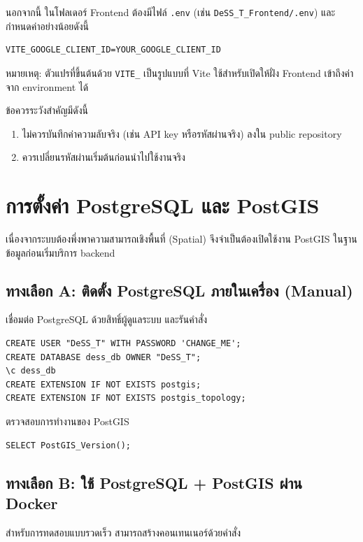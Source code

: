 นอกจากนี้ ในโฟลเดอร์ Frontend ต้องมีไฟล์ \texttt{.env} (เช่น \texttt{DeSS\_T\_Frontend/.env}) และกำหนดค่าอย่างน้อยดังนี้
\begin{verbatim}
VITE_GOOGLE_CLIENT_ID=YOUR_GOOGLE_CLIENT_ID
\end{verbatim}

หมายเหตุ: ตัวแปรที่ขึ้นต้นด้วย \texttt{VITE\_} เป็นรูปแบบที่ Vite ใช้สำหรับเปิดให้ฝั่ง Frontend เข้าถึงค่าจาก environment ได้

ข้อควรระวังสำคัญมีดังนี้
\begin{enumerate}
    \item ไม่ควรบันทึกค่าความลับจริง (เช่น API key หรือรหัสผ่านจริง) ลงใน public repository
    \item ควรเปลี่ยนรหัสผ่านเริ่มต้นก่อนนำไปใช้งานจริง
\end{enumerate}

\section{การตั้งค่า PostgreSQL และ PostGIS}
\begin{mypara}
    \indent เนื่องจากระบบต้องพึ่งพาความสามารถเชิงพื้นที่ (Spatial) จึงจำเป็นต้องเปิดใช้งาน PostGIS ในฐานข้อมูลก่อนเริ่มบริการ backend
\end{mypara}

\subsection{ทางเลือก A: ติดตั้ง PostgreSQL ภายในเครื่อง (Manual)}
\begin{mypara}
    \indent เชื่อมต่อ PostgreSQL ด้วยสิทธิ์ผู้ดูแลระบบ และรันคำสั่ง
\end{mypara}
\begin{verbatim}
CREATE USER "DeSS_T" WITH PASSWORD 'CHANGE_ME';
CREATE DATABASE dess_db OWNER "DeSS_T";
\c dess_db
CREATE EXTENSION IF NOT EXISTS postgis;
CREATE EXTENSION IF NOT EXISTS postgis_topology;
\end{verbatim}

ตรวจสอบการทำงานของ PostGIS
\begin{verbatim}
SELECT PostGIS_Version();
\end{verbatim}

\subsection{ทางเลือก B: ใช้ PostgreSQL + PostGIS ผ่าน Docker}
\begin{mypara}
    \indent สำหรับการทดสอบแบบรวดเร็ว สามารถสร้างคอนเทนเนอร์ด้วยคำสั่ง
\end{mypara}

